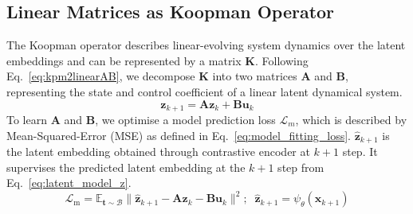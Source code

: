 \documentclass{article}
\begin{document}
\subsection{Linear Matrices as Koopman Operator}
The Koopman operator describes linear-evolving system dynamics over the latent embeddings and can be represented by a matrix $\mathbf{K}$. Following Eq.~\eqref{eq:kpm2linearAB}, we decompose $\mathbf{K}$ into two matrices $\mathbf{A}$ and $\mathbf{B}$, representing the state and control coefficient of a linear latent dynamical system.
\begin{equation}
    \mathbf{z}_{k+1} = \mathbf{A}\mathbf{z}_k + \mathbf{B}\mathbf{u}_k
\label{eq:latent_model_z}
\end{equation}
To learn $\mathbf{A}$ and $\mathbf{B}$, we optimise a model prediction loss $\mathcal{L}_m$, which is described by Mean-Squared-Error (MSE) as defined in Eq.~\eqref{eq:model_fitting_loss}. $\mathbf{\hat{z}}_{k+1}$ is the latent embedding obtained through contrastive encoder at $k+1$ step. It supervises the predicted latent embedding at the $k+1$ step from Eq.~\eqref{eq:latent_model_z}.
\begin{equation}
    \mathcal{L}_\text{m} = \mathbb{E}_{\mathbf{t} \sim \mathcal{B}} \lVert \mathbf{\hat{z}}_{k+1} - \mathbf{A}\mathbf{z}_k - \mathbf{B}\mathbf{u}_k \rVert ^2; \;\; \mathbf{\hat{z}}_{k+1} = \psi_{\theta}(\mathbf{x}_{k+1})
    \label{eq:model_fitting_loss}
\end{equation}


\end{document}
